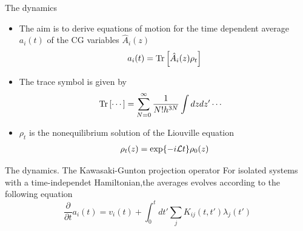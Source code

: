 \documentclass{beamer}
\begin{document}
\begin{frame}{The dynamics}
  \begin{itemize}
    \item The aim is to \alert{derive equations of motion} for the time dependent average $a_i(t)$ of the CG variables $\hat{A}_i(z)$
      \begin{align}
        a_i(t)={\rm Tr}\left[\hat{A}_i(z)\rho_t\right]
        \nonumber
      \end{align}
    \item The trace symbol is given by
\begin{align}
  {\rm Tr}\left[\cdots\right]&=\sum_{N=0}^\infty \frac{1}{N!h^{3N}}
\int dzdz'\cdots \nonumber
\end{align}
\item $\rho_t$ is the nonequilibrium solution of the Liouville equation
\begin{align}
    \rho_t(z) = {\rm exp}\{-i{\cal L}t\}\rho_0(z)
    \nonumber
\end{align}
  \end{itemize}
\end{frame}

\begin{frame}{The dynamics. The Kawasaki-Gunton projection operator}
    For isolated systems with a time-independet Hamiltonian,the averages evolves according to the following equation \cite{Grabert1982}
      \begin{equation}
\frac{\partial }{\partial t} a_i(t)
= v_i(t) + \int_0^t dt' \sum_j K_{ij}(t,t') \lambda_j(t')
\nonumber
\end{equation}
\end{frame}
\end{document}

